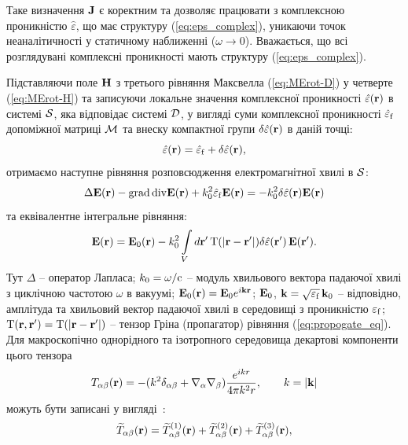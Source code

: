 \documentclass[14pt,twoside]{vakthesis}
\begin{document}
Таке визначення $\bf J$ є коректним та дозволяє працювати з комплексною проникністю $\hat{\varepsilon}$, що має структуру (\ref{eq:eps_complex}), уникаючи точок неаналітичності у статичному наближенні ($\omega \to 0$). Вважається, що всі розглядувані комплексні проникності мають структуру (\ref{eq:eps_complex}).

Підставляючи поле ${\bf H}$ з третього рівняння Максвелла (\ref{eq:MErot-D}) у четверте (\ref{eq:MErot-H}) та записуючи локальне значення комплексної проникності $\hat{\varepsilon}({\bf r})$ в системі $\cal S$, яка відповідає системі $\cal D$, у вигляді суми комплексної проникності $\hat{\varepsilon}_{\rm f}$ допоміжної матриці $\cal M$ та внеску компактної групи $\delta\hat{\varepsilon}({\bf r})$ в даній точці:
$$
\hat{\varepsilon}({\bf r}) = \hat{\varepsilon}_{\rm f} + \delta\hat{\varepsilon}({\bf r}),
$$
отримаємо наступне рівняння розповсюдження електромагнітної хвилі в $\cal S$:
\begin{equation} \label{eq:propogate_eq}
\Delta {\bf E} ({\bf r}) - {\rm grad}\, {\rm div} {\bf E} ({\bf r}) + k_0^{2}\hat{\varepsilon}_{\rm f} {\bf E} ({\bf r})  = - k_{0}^{2} \delta
\hat{\varepsilon} ({\bf r}) {\bf E} ({\bf r})
\end{equation}
та еквівалентне інтегральне рівняння:
\begin{equation}\label{eq:integral_field}
{\bf E}({\rm {\bf r}}) = {\bf E}_{0} ({\bf r}) -
k_{0}^{2} \int\limits_{V} d{\bf r}'\, {\rm T}(|{\bf r} - {\bf r}'|)
\delta \hat{\varepsilon} ({\bf r}')\, {\bf E}({\bf r}').
\end{equation}
Тут $\Delta$ -- оператор Лапласа; $k_0 = \omega/{\rm c}$ -- модуль хвильового вектора падаючої хвилі з циклічною частотою $\omega$ в вакуумі; ${\bf E}_0 ({\bf r}) = {\bf E}_0 e^{i {\bf k}{\bf r}}$;
${\bf E}_0$, ${\bf k} = \sqrt{{\varepsilon}_{\rm f}}\,
{\bf k}_0$ -- відповідно, амплітуда та хвильовий вектор
падаючої хвилі в середовищі з проникністю ${\varepsilon}_{\rm f}$; 
${\rm T}({\bf r}, {\bf r}') = {\rm T}(|{\bf r} - {\bf r}'|)$ -- тензор Гріна (пропагатор) рівняння (\ref{eq:propogate_eq}). Для макроскопічно однорідного та ізотропного середовища декартові компоненти цього тензора 
\begin{equation}\label{eq:propogator-eps-origin}
	T_{\alpha\beta}({\rm {\bf r}}) = -(k^2\delta_{\alpha\beta} + \nabla_\alpha \nabla_\beta)\frac{e^{ikr}}{4\pi k^2r},\qquad k=|{\bf k}|
\end{equation}
можуть бути записані у вигляді~\cite{Ryzhov1965, Weighofer1989, Weiglhofer1995, Sushko2004}:
\begin{eqnarray}\label{eq:propagator-eps}
{\widetilde T}_{\alpha\beta} ({\rm {\bf r}})
= {\widetilde T}_{\alpha\beta}^{(1)} ({\rm {\bf r}}) + {\widetilde T}_{\alpha\beta}^{(2)} ({\rm {\bf r}}) + {\widetilde T}_{\alpha\beta}^{(3)} ({\rm {\bf r}}),
\end{eqnarray}
\end{document}
